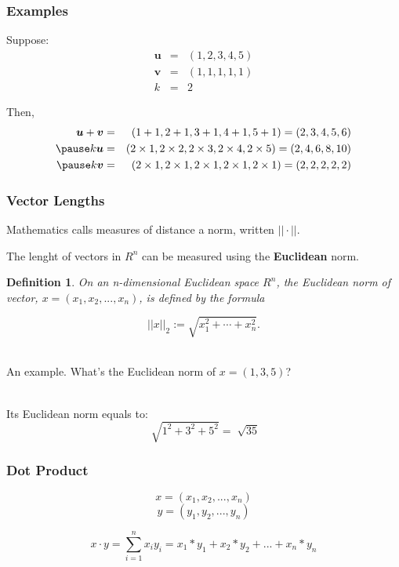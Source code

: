 \documentclass[handout]{beamer}
\newtheorem{defn}{Definition}
\numberwithin{equation}{section}
\begin{document}
\begin{frame}
\frametitle{Examples} 

Suppose:
\begin{eqnarray}
\boldsymbol{u} & = & (1, 2, 3, 4, 5) \nonumber \\
\boldsymbol{v} & = & (1, 1, 1, 1, 1) \nonumber \\
k & = & 2 \nonumber 
\end{eqnarray} \pause

Then, 
\begin{eqnarray}
\boldsymbol{u}  + \boldsymbol{v} & = & (1 + 1, 2 + 1, 3+ 1, 4 + 1, 5+ 1)  = (2, 3, 4, 5, 6)\nonumber \\ \pause
k \boldsymbol{u} & = & (2 \times 1, 2 \times 2, 2 \times 3, 2 \times 4, 2 \times 5) = (2, 4, 6, 8, 10) \nonumber \\ \pause
k \boldsymbol{v} & = & (2 \times 1,2 \times 1,2 \times 1,2 \times 1,2 \times 1) = (2, 2, 2, 2, 2) \nonumber 
\end{eqnarray}

\end{frame}



\begin{frame}
\frametitle{Vector Lengths}

Mathematics calls measures of distance a norm, written $||\cdot||$. \pause

The lenght of vectors in $R^n$ can be measured using the \textbf{Euclidean} norm.\pause

\begin{defn}
On an n-dimensional Euclidean space $R^{n}$, the Euclidean norm of vector, $x = (x_{1}, x_{2}, ..., x_{n})$, is defined by the formula

$$ ||x||_{2} :={\sqrt {x_{1}^{2} + \cdots + x_{n}^{2}}}. $$
\end{defn} \pause

\ \\An example. What's the Euclidean norm of $x = (1, 3, 5)$?\pause

\ \\Its Euclidean norm equals to:
$$ \sqrt[]{1^{2} + 3^{2} + 5^{2}} = \sqrt[]{35}$$
\end{frame}




\begin{frame}
\frametitle{Dot Product}
$$x = (x_{1}, x_{2}, ..., x_{n})$$
$$y = (y_{1}, y_{2}, ..., y_{n})$$

$$x\cdot y =\sum_{i=1}^n x_i y_i= x_{1}*y_{1}+ x_{2}* y_{2} +...+x_{n}*y_{n}$$
\end{frame}
\end{document}
